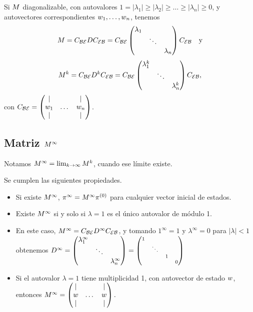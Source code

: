 Si $\Mb$ diagonalizable, con autovalores $1 = |\lambda_1| \ge |\lambda_2| \ge \dots \ge |\lambda_n| \ge 0$, y autovectores correspondientes $\wb_1, \dots, \wb_n$, tenemos
$$
\Mb = \Cb_{\B\E} \Db \Cb_{\E\B} = \Cb_{\B\E} \begin{pmatrix} \lambda_1 & & \\ & \ddots & \\ & & \lambda_n \end{pmatrix} \Cb_{\E\B} \quad \text{y}
$$
$$
\Mb^k = \Cb_{\B\E} \Db^{k} \Cb_{\E\B} = \Cb_{\B\E} \begin{pmatrix} \lambda_1^k & & \\ & \ddots & \\ & & \lambda_n^k \end{pmatrix} \Cb_{\E\B},
$$
con $\Cb_{\B\E} = \begin{pmatrix} \vert & & \vert \\ \wb_1 & \dots & \wb_n \\ \vert & & \vert \end{pmatrix}$.

\subsection{Matriz $\Mb^{\infty}$}

Notamos $\Mb^{\infty} = \lim_{k \rightarrow \infty} \Mb^k$, cuando ese límite existe.

\begin{prop} Se cumplen las siguientes propiedades.
\begin{itemize}
\item Si existe $\Mb^{\infty}$, $\pib^{\infty} = \Mb^{\infty} \pib^{(0)}$ para cualquier vector inicial de estados.
\item Existe $\Mb^{\infty}$ si y solo si $\lambda = 1$ es el único autovalor de módulo 1.
\item En este caso,
$\Mb^\infty = \Cb_{\B\E} \Db^\infty \Cb_{\E\B}$, y tomando $1^\infty = 1$ y $\lambda^\infty = 0$ para $|\lambda| < 1$ obtenemos $\Db^\infty = \begin{pmatrix} \lambda_1^\infty & & \\ & \ddots & \\ & & \lambda_n^\infty \end{pmatrix} =
{\scriptsize \begin{pmatrix} \begin{matrix} 1 & & \\ & \ddots & \\ & & 1\end{matrix} &  \\  & 0\end{pmatrix}}$
\item Si el autovalor $\lambda = 1$ tiene multiplicidad 1, con autovector de estado $\wb$, entonces
$
\Mb^{\infty} = \begin{pmatrix} \vert & & \vert \\ \wb & \dots & \wb \\ \vert & & \vert \end{pmatrix}.
$
\end{itemize}
\end{prop}


